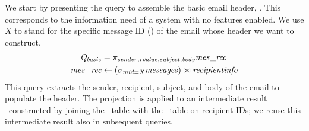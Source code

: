We start by presenting the query to assemble the basic email header, \Qbasic.
This corresponds to the information need of a system with no features enabled.
We use $X$ to stand for the specific message ID (\midatt) of the email whose
header we want to construct.
%
\begin{align*}
\Qbasic &= 
\projectRel{\sender,\rvalue,\subject,\body} \mrtable \\
\mrtable &\leftarrow (\selectRel\midCond\messages) \bowtie \recipientinfo
\end{align*}
%
This query extracts the sender, recipient, subject, and body of the email to
populate the header. The projection is applied to an intermediate result
\mrtable\ constructed by joining the \messages\ table with the \recipientinfo\
table on recipient IDs; we reuse this intermediate result also in subsequent
queries.



